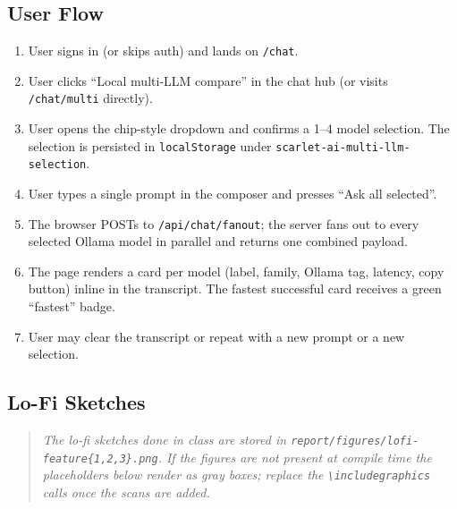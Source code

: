 \documentclass[11pt]{article}
\begin{document}
\subsection{User Flow}

\begin{enumerate}[leftmargin=*]
  \item User signs in (or skips auth) and lands on \texttt{/chat}.
  \item User clicks ``Local multi-LLM compare'' in the chat hub
    (or visits \texttt{/chat/multi} directly).
  \item User opens the chip-style dropdown and confirms a 1--4 model
    selection.  The selection is persisted in
    \texttt{localStorage} under
    \texttt{scarlet-ai-multi-llm-selection}.
  \item User types a single prompt in the composer and presses
    ``Ask all selected''.
  \item The browser POSTs to \texttt{/api/chat/fanout}; the server
    fans out to every selected Ollama model in parallel and returns
    one combined payload.
  \item The page renders a card per model (label, family, Ollama
    tag, latency, copy button) inline in the transcript.  The fastest
    successful card receives a green ``fastest'' badge.
  \item User may clear the transcript or repeat with a new prompt or a
    new selection.
\end{enumerate}

\subsection{Lo-Fi Sketches}

\begin{quote}\itshape
The lo-fi sketches done in class are stored in
\texttt{report/figures/lofi-feature\{1,2,3\}.png}.  If the figures are
not present at compile time the placeholders below render as gray
boxes; replace the \texttt{\textbackslash includegraphics} calls
once the scans are added.
\end{quote}

\begin{center}
\end{center}
\end{document}
